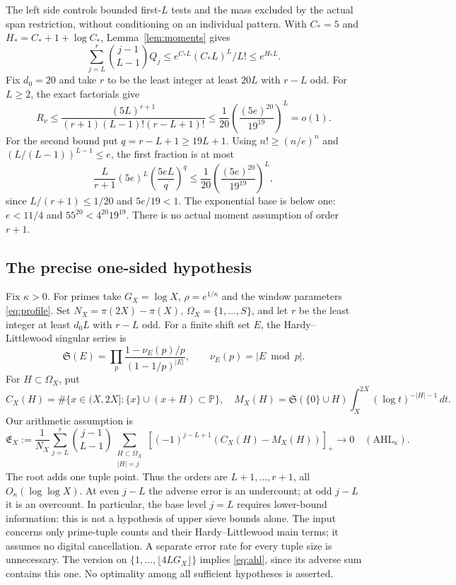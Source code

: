 \documentclass[11pt,a4paper]{article}
\newcommand{\pp}[1]{\left[#1\right]_+}
\begin{document}
The left side controls bounded first-$L$ tests and the mass excluded
by the actual span restriction, without conditioning on an individual pattern.
With $C_*=5$ and $H_*=C_*+1+\log C_*$,
Lemma~\ref{lem:moments} gives
\begin{equation}\label{eq:weightedmoments}
 \sum_{j=L}^r\binom{j-1}{L-1}Q_j
 \le e^{C_*L}(C_*L)^L/L!\le e^{H_*L}.
\end{equation}
Fix $d_0=20$ and take $r$ to be the least integer at least $20L$
with $r-L$ odd. For $L\ge2$, the exact factorials give
\[
 R_\nu\le\frac{(5L)^{r+1}}{(r+1)(L-1)!(r-L+1)!}
       \le\frac1{20}\left(\frac{(5e)^{20}}{19^{19}}\right)^L=o(1).
\]
For the second bound put $q=r-L+1\ge19L+1$. Using
$n!\ge(n/e)^n$ and $(L/(L-1))^{L-1}\le e$, the first fraction is at most
\[
 \frac{L}{r+1}(5e)^L\left(\frac{5eL}{q}\right)^q
 \le\frac1{20}\left(\frac{(5e)^{20}}{19^{19}}\right)^L,
\]
since $L/(r+1)\le1/20$ and $5e/19<1$.
The exponential base is below one: $e<11/4$ and
$55^{20}<4^{20}19^{19}$. There is no actual moment assumption
of order $r+1$.

\subsection[One-sided tuple hypothesis]{The precise one-sided hypothesis}

Fix $\kappa>0$. For primes take $G_X=\log X$, $\rho=e^{1/\kappa}$ and the window parameters
\eqref{eq:profile}. Set $N_X=\pi(2X)-\pi(X)$,
$\Omega_X=\{1,\ldots,S\}$, and let $r$ be the least integer
at least $d_0L$ with $r-L$ odd. For a finite shift set $E$, the
Hardy--Littlewood singular series \cite{hardylittlewood} is
\[
 \mathfrak S(E)=\prod_p\frac{1-\nu_E(p)/p}{(1-1/p)^{|E|}},
                    \qquad\nu_E(p)=|E\bmod p|.
\]
For $H\subset\Omega_X$, put
\[
 C_X(H)=\#\{x\in(X,2X]:\{x\}\cup(x+H)\subset\mathbb P\},
 \quad M_X(H)=\mathfrak S(\{0\}\cup H)\int_X^{2X}(\log t)^{-|H|-1}\,dt.
\]
Our arithmetic assumption is
\begin{equation}\label{eq:ahl}
 \mathfrak E_X:=\frac1{N_X}\sum_{j=L}^r\binom{j-1}{L-1}
  \sum_{\substack{H\subset\Omega_X\\|H|=j}}
       \pp{(-1)^{j-L+1}(C_X(H)-M_X(H))}\longrightarrow0
                 \quad(\mathrm{AHL}_\kappa).
\end{equation}
The root adds one tuple point. Thus the orders are $L+1,\ldots,r+1$,
all $O_\kappa(\log\log X)$. At even $j-L$ the adverse error is an
undercount; at odd $j-L$ it is an overcount. In particular, the base
level $j=L$ requires lower-bound information: this is not a hypothesis
of upper sieve bounds alone. The input concerns only
prime-tuple counts and their Hardy--Littlewood main terms; it assumes
no digital cancellation. A separate error rate for every tuple size is
unnecessary. The version on $\{1,\ldots,\lfloor4LG_X\rfloor\}$
implies \eqref{eq:ahl}, since its adverse sum contains this one.
No optimality among all sufficient hypotheses is asserted.
\end{document}
